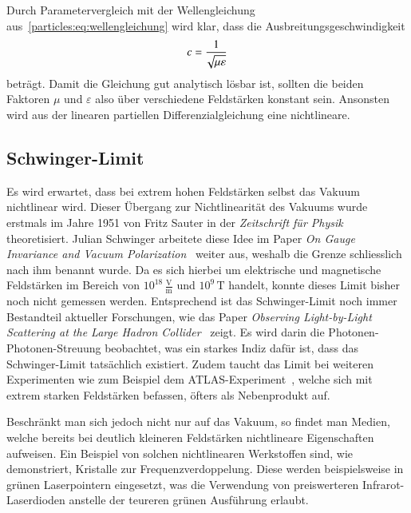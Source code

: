 Durch Parametervergleich mit der Wellengleichung aus~\eqref{particles:eq:wellengleichung} wird klar, dass die Ausbreitungsgeschwindigkeit
\[
    c = \frac{1}{\!\sqrt{\mu\varepsilon\mathstrut}}
\]
beträgt.
Damit die Gleichung gut analytisch lösbar ist, sollten die beiden Faktoren $\mu$ und $\varepsilon$ also über verschiedene Feldstärken konstant sein.
Ansonsten wird aus der linearen partiellen Differenzialgleichung eine nichtlineare.


\subsection{Schwinger-Limit}\label{particles:section:lin-medium:schwinger}
Es wird erwartet, dass bei extrem hohen Feldstärken selbst das Vakuum nichtlinear wird.
%
Dieser Übergang zur Nichtlinearität des Vakuums wurde erstmals im Jahre 1951 von Fritz Sauter in der \emph{Zeitschrift für Physik}~\cite{particles:fritz_sauter} theoretisiert.
%
Julian Schwinger arbeitete diese Idee im Paper \emph{On Gauge Invariance and Vacuum Polarization}~\cite{particles:schwinger-limit} weiter aus, 
%
weshalb die Grenze schliesslich nach ihm benannt wurde.
Da es sich hierbei um elektrische und magnetische Feldstärken im Bereich von $10^{18}\,\frac{\text{V}}{\text{m}}$ und $10^9\,\text{T}$ handelt, 
konnte dieses Limit bisher noch nicht gemessen werden.
Entsprechend ist das Schwinger-Limit noch immer Bestandteil aktueller Forschungen, 
wie das Paper \emph{Observing Light-by-Light Scattering at the Large Hadron Collider}~\cite{particles:photon_photon_scattering} zeigt.
Es wird darin die Photonen-Photonen-Streuung beobachtet, was ein starkes Indiz dafür ist, 
%
dass das Schwinger-Limit tatsächlich existiert.
Zudem taucht das Limit bei weiteren Experimenten wie zum Beispiel dem ATLAS-Experiment~\cite{particles:atlas-experiment}, 
%
welche sich mit extrem starken Feldstärken befassen, öfters als Nebenprodukt auf.

Beschränkt man sich jedoch nicht nur auf das Vakuum, so findet man Medien, 
welche bereits bei deutlich kleineren Feldstärken nichtlineare Eigenschaften aufweisen.
Ein Beispiel von solchen nichtlinearen Werkstoffen sind, 
wie~\cite{particles:frequenzverdopplung} demonstriert, Kristalle zur Frequenzverdoppelung.
%
Diese werden beispielsweise in grünen Laserpointern eingesetzt, 
was die Verwendung von preiswerteren Infrarot-Laserdioden anstelle der teureren grünen Ausführung erlaubt.
